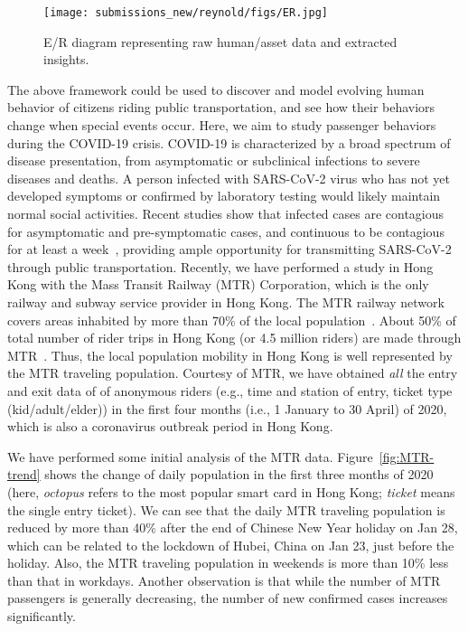 \documentclass[11pt]{article}
\begin{document}
\begin{figure}[htpb]
    \centering
        \texttt{[image: submissions\_new/reynold/figs/ER.jpg]}
    \caption{E/R diagram representing raw human/asset data and extracted insights.}
    \label{fig:ER}
\end{figure}

The above framework could be used to discover and model evolving human behavior of citizens riding public transportation, and see how their behaviors change when special events occur. Here, we aim to study passenger behaviors during the COVID-19 crisis. COVID-19 is characterized by a broad spectrum of disease presentation, from asymptomatic or subclinical infections to severe diseases and deaths. A person infected with SARS-CoV-2 virus who has not yet developed symptoms or confirmed by laboratory testing would likely maintain normal social activities. Recent studies show that infected cases are contagious for asymptomatic and pre-symptomatic cases, and continuous to be contagious for at least a week~\cite{lau20, emery20}, providing ample opportunity for transmitting SARS-CoV-2 through public transportation. Recently, we have performed a study in Hong Kong with the Mass Transit Railway (MTR) Corporation, which is the only railway and subway service provider in Hong Kong.  The MTR railway network covers areas inhabited by more than 70\% of the local population~\cite{housing14}.  About 50\% of total number of rider trips in Hong Kong (or 4.5 million riders) are made through MTR~\cite{transport17}.  Thus, the local population mobility in Hong Kong is well represented by the MTR traveling population. Courtesy of MTR, we have obtained {\it all} the entry and exit data of of anonymous riders (e.g., time and station of entry, ticket type (kid/adult/elder)) in the first four months (i.e., 1 January to 30 April) of 2020, which is also a coronavirus outbreak period in Hong Kong. 

We have performed some initial analysis of the MTR data. Figure~\ref{fig:MTR-trend} shows the change of daily population in the first three months of 2020 (here, {\it octopus} refers to the most popular smart card in Hong Kong; {\it ticket} means the single entry ticket). We can see that the daily MTR traveling population is reduced by more than 40\% after the end of Chinese New Year holiday on Jan 28, which can be related to the lockdown of Hubei, China on Jan 23, just before the holiday. Also, the MTR traveling population in weekends is more than 10\% less than that in workdays. Another observation is that while the number of MTR passengers is generally decreasing, the number of new confirmed cases increases significantly.
\end{document}

